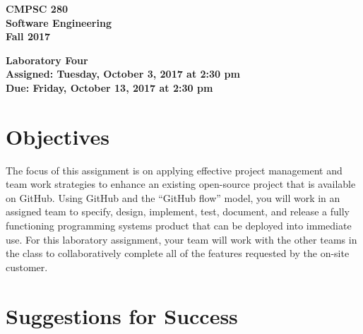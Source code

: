 \documentclass[11pt]{article}
\newcommand{\assignmentduedate}{October 13}
\newcommand{\assignmentassignedate}{October 3}
\newcommand{\assignmentnumber}{Four}
\newcommand{\labyear}{2017}
\newcommand{\labday}{Tuesday}
\newcommand{\labdueday}{Friday}
\newcommand{\labtime}{2:30 pm}
\newcommand{\assigneddate}{Assigned: \labday, \assignmentassignedate, \labyear{} at \labtime{}}
\newcommand{\duedate}{Due: \labdueday, \assignmentduedate, \labyear{} at \labtime{}}
\newcommand{\labtitle}[1]
{
  \begin{center}
    \begin{center}
      \bf
      CMPSC 280\\Software Engineering\\
      Fall 2017\\
      \medskip
    \end{center}
    \bf
    #1
  \end{center}
}
\begin{document}
\thispagestyle{empty}

\labtitle{Laboratory \assignmentnumber{} \\ \assigneddate{} \\ \duedate{}}

\section*{Objectives}

The focus of this assignment is on applying effective project management and team work strategies to enhance an existing
open-source project that is available on GitHub. Using GitHub and the ``GitHub flow'' model, you will work in an
assigned team to specify, design, implement, test, document, and release a fully functioning programming systems product
that can be deployed into immediate use. For this laboratory assignment, your team will work with the other teams in the
class to collaboratively complete all of the features requested by the on-site customer.

\section*{Suggestions for Success}
\end{document}
